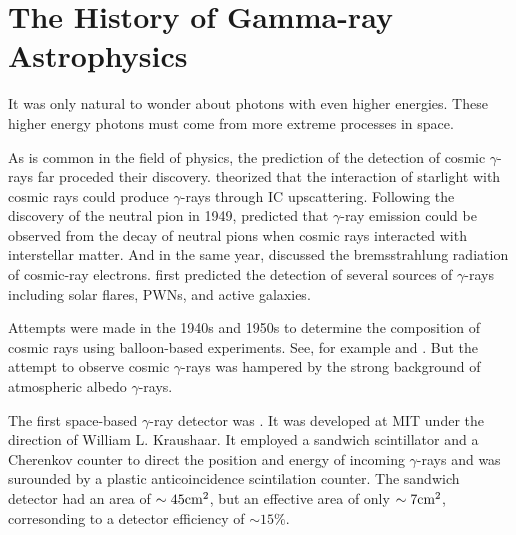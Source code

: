 
\section{The History of Gamma-ray Astrophysics}

It was only natural to wonder about photons with even
higher energies. These higher energy photons must
come from more extreme processes in space.

As is common in the field of physics, the prediction of
the detection of cosmic $\gamma$-rays far proceded their discovery.
\cite{feenberg_1948_interaction-cosmic-ray} theorized that the interaction
of starlight with cosmic rays could produce $\gamma$-rays through
\ac{IC} upscattering.  Following the discovery of the neutral
pion in 1949, \cite{hayakawa_1952_propagation-cosmic}
predicted that $\gamma$-ray emission could be observed from the
decay of neutral pions when cosmic rays interacted with interstellar
matter.  And in the same year, \cite{hutchinson_1952_possible-relation}
discussed the bremsstrahlung radiation of cosmic-ray electrons.
\cite{morrison_1958_gamma-ray-astronomy} first predicted the detection
of several sources of $\gamma$-rays including solar flares, \acp{PWN},
and active galaxies.

Attempts were made in the 1940s and 1950s to determine the
composition of cosmic rays using balloon-based experiments. See,
for example \cite{critchfield_1952_radiation-balloon} and
\cite{hulsizer_1948_search-electrons}.  But the attempt to observe
cosmic $\gamma$-rays was hampered by the strong background of atmospheric
albedo $\gamma$-rays.



The first space-based $\gamma$-ray detector was \explorerxi
\cite{kraushaar_1965_explorer-experiment}.  It was developed at \ac{MIT}
under the direction of William L. Kraushaar.  It employed a sandwich
scintillator and a Cherenkov counter to direct the position and energy
of incoming $\gamma$-rays and was surounded by a plastic anticoincidence
scintilation counter. The sandwich detector had an area of $\sim45\text{cm}^2$,
but an effective area of only $\sim 7\text{cm}^2$, corresonding
to a detector efficiency of $\sim 15\%$.

